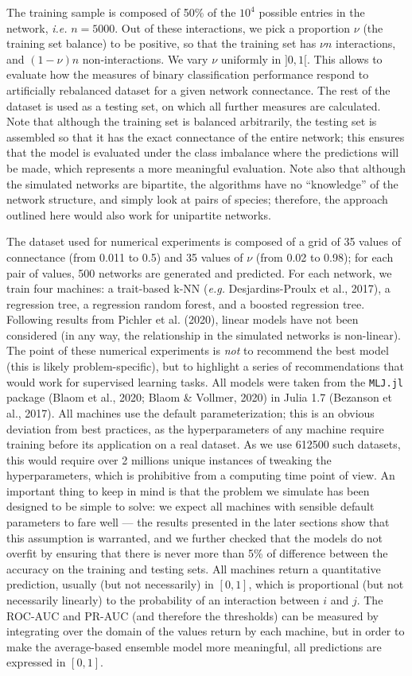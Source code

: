 \documentclass[11pt]{article}
\begin{document}
The training sample is composed of 50\% of the \(10^4\) possible entries
in the network, \emph{i.e.} \(n=5000\). Out of these interactions, we
pick a proportion \(\nu\) (the training set balance) to be positive, so
that the training set has \(\nu n\) interactions, and \((1-\nu) n\)
non-interactions. We vary \(\nu\) uniformly in \(]0,1[\). This allows to
evaluate how the measures of binary classification performance respond
to artificially rebalanced dataset for a given network connectance. The
rest of the dataset is used as a testing set, on which all further
measures are calculated. Note that although the training set is balanced
arbitrarily, the testing set is assembled so that it has the exact
connectance of the entire network; this ensures that the model is
evaluated under the class imbalance where the predictions will be made,
which represents a more meaningful evaluation. Note also that although
the simulated networks are bipartite, the algorithms have no
``knowledge'' of the network structure, and simply look at pairs of
species; therefore, the approach outlined here would also work for
unipartite networks.

The dataset used for numerical experiments is composed of a grid of 35
values of connectance (from 0.011 to 0.5) and 35 values of \(\nu\) (from
0.02 to 0.98); for each pair of values, 500 networks are generated and
predicted. For each network, we train four machines: a trait-based k-NN
(\emph{e.g.} Desjardins-Proulx et al., 2017), a regression tree, a
regression random forest, and a boosted regression tree. Following
results from Pichler et al. (2020), linear models have not been
considered (in any way, the relationship in the simulated networks is
non-linear). The point of these numerical experiments is \emph{not} to
recommend the best model (this is likely problem-specific), but to
highlight a series of recommendations that would work for supervised
learning tasks. All models were taken from the \texttt{MLJ.jl} package
(Blaom et al., 2020; Blaom \& Vollmer, 2020) in Julia 1.7 (Bezanson et
al., 2017). All machines use the default parameterization; this is an
obvious deviation from best practices, as the hyperparameters of any
machine require training before its application on a real dataset. As we
use 612500 such datasets, this would require over 2 millions unique
instances of tweaking the hyperparameters, which is prohibitive from a
computing time point of view. An important thing to keep in mind is that
the problem we simulate has been designed to be simple to solve: we
expect all machines with sensible default parameters to fare well ---
the results presented in the later sections show that this assumption is
warranted, and we further checked that the models do not overfit by
ensuring that there is never more than 5\% of difference between the
accuracy on the training and testing sets. All machines return a
quantitative prediction, usually (but not necessarily) in \([0,1]\),
which is proportional (but not necessarily linearly) to the probability
of an interaction between \(i\) and \(j\). The ROC-AUC and PR-AUC (and
therefore the thresholds) can be measured by integrating over the domain
of the values return by each machine, but in order to make the
average-based ensemble model more meaningful, all predictions are
expressed in \([0,1]\).
\end{document}
